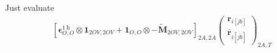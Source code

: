 Just evaluate
\begin{align}
    &\left[ \bm{\epsilon}^{1 \mathrm{~h}}_{O,O} \otimes \bm{1}_{2OV,2OV} + \bm{1}_{O,O} \otimes -\tilde{\bm{M}}_{2OV,2OV} \right]_{2A,2A} \begin{pmatrix}
    \bm{r}_{i[jb]} \\
\bm{\bar{r}}_{i[\bar{jb}]}
\end{pmatrix}_{2A,T} \\
\end{align}
